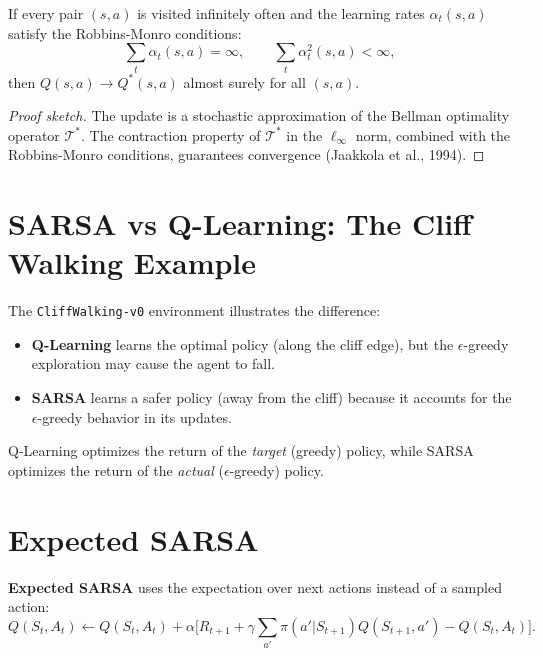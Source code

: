 \begin{theorem}
\label{thm:q_learning_conv}
If every pair $(s,a)$ is visited infinitely often and the learning rates
$\alpha_t(s,a)$ satisfy the Robbins-Monro conditions:
\[
    \sum_t \alpha_t(s,a) = \infty, \qquad \sum_t \alpha_t^2(s,a) < \infty,
\]
then $Q(s,a) \to Q^*(s,a)$ almost surely for all $(s,a)$.
\end{theorem}

\begin{proof}[Proof sketch]
The update is a stochastic approximation of the Bellman optimality
operator $\mathcal{T}^*$. The contraction property of $\mathcal{T}^*$
in the $\ell_\infty$ norm, combined with the Robbins-Monro conditions,
guarantees convergence (Jaakkola et al., 1994).
\end{proof}

\section{SARSA vs Q-Learning: The Cliff Walking Example}
\label{sec:cliff}

\begin{example}
The \texttt{CliffWalking-v0} environment illustrates the difference:
\begin{itemize}
    \item \textbf{Q-Learning} learns the optimal policy (along the cliff edge),
    but the $\epsilon$-greedy exploration may cause the agent to fall.
    \item \textbf{SARSA} learns a safer policy (away from the cliff) because
    it accounts for the $\epsilon$-greedy behavior in its updates.
\end{itemize}
Q-Learning optimizes the return of the \emph{target} (greedy) policy, while
SARSA optimizes the return of the \emph{actual} ($\epsilon$-greedy) policy.
\end{example}

\section{Expected SARSA}
\label{sec:expected_sarsa}

\begin{definition}
\textbf{Expected SARSA} uses the expectation over next actions instead
of a sampled action:
\[
    Q(S_t, A_t) \leftarrow Q(S_t, A_t) + \alpha \Big[
    R_{t+1} + \gamma \sum_{a'} \pi(a' | S_{t+1}) Q(S_{t+1}, a') - Q(S_t, A_t) \Big].
\]
\end{definition}

